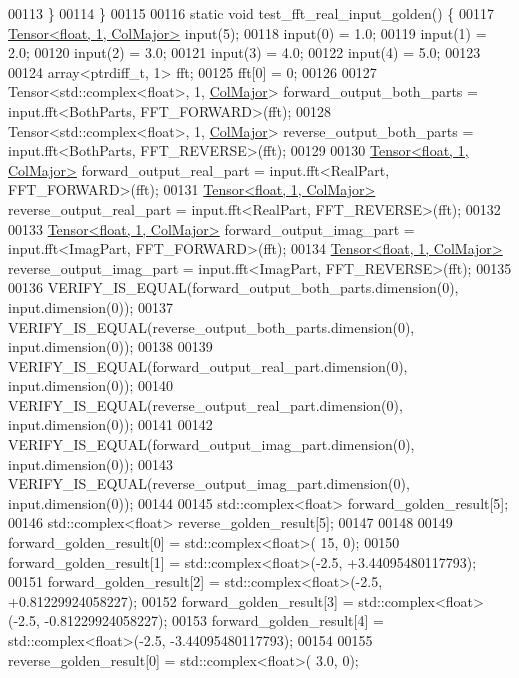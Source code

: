 \begin{DoxyCode}
00113   \}
00114 \}
00115 
00116 \textcolor{keyword}{static} \textcolor{keywordtype}{void} test\_fft\_real\_input\_golden() \{
00117   \hyperlink{class_eigen_1_1_tensor}{Tensor<float, 1, ColMajor>} input(5);
00118   input(0) = 1.0;
00119   input(1) = 2.0;
00120   input(2) = 3.0;
00121   input(3) = 4.0;
00122   input(4) = 5.0;
00123 
00124   array<ptrdiff\_t, 1> fft;
00125   fft[0] = 0;
00126 
00127   Tensor<std::complex<float>, 1, \hyperlink{group__enums_ggaacded1a18ae58b0f554751f6cdf9eb13a0cbd4bdd0abcfc0224c5fcb5e4f6669a}{ColMajor}> forward\_output\_both\_parts = input.fft<BothParts, 
      FFT\_FORWARD>(fft);
00128   Tensor<std::complex<float>, 1, \hyperlink{group__enums_ggaacded1a18ae58b0f554751f6cdf9eb13a0cbd4bdd0abcfc0224c5fcb5e4f6669a}{ColMajor}> reverse\_output\_both\_parts = input.fft<BothParts, 
      FFT\_REVERSE>(fft);
00129 
00130   \hyperlink{class_eigen_1_1_tensor}{Tensor<float, 1, ColMajor>} forward\_output\_real\_part = input.fft<RealPart, 
      FFT\_FORWARD>(fft);
00131   \hyperlink{class_eigen_1_1_tensor}{Tensor<float, 1, ColMajor>} reverse\_output\_real\_part = input.fft<RealPart, 
      FFT\_REVERSE>(fft);
00132 
00133   \hyperlink{class_eigen_1_1_tensor}{Tensor<float, 1, ColMajor>} forward\_output\_imag\_part = input.fft<ImagPart, 
      FFT\_FORWARD>(fft);
00134   \hyperlink{class_eigen_1_1_tensor}{Tensor<float, 1, ColMajor>} reverse\_output\_imag\_part = input.fft<ImagPart, 
      FFT\_REVERSE>(fft);
00135 
00136   VERIFY\_IS\_EQUAL(forward\_output\_both\_parts.dimension(0), input.dimension(0));
00137   VERIFY\_IS\_EQUAL(reverse\_output\_both\_parts.dimension(0), input.dimension(0));
00138 
00139   VERIFY\_IS\_EQUAL(forward\_output\_real\_part.dimension(0), input.dimension(0));
00140   VERIFY\_IS\_EQUAL(reverse\_output\_real\_part.dimension(0), input.dimension(0));
00141 
00142   VERIFY\_IS\_EQUAL(forward\_output\_imag\_part.dimension(0), input.dimension(0));
00143   VERIFY\_IS\_EQUAL(reverse\_output\_imag\_part.dimension(0), input.dimension(0));
00144 
00145   std::complex<float> forward\_golden\_result[5];
00146   std::complex<float> reverse\_golden\_result[5];
00147 
00148 
00149   forward\_golden\_result[0] = std::complex<float>(  15, 0);
00150   forward\_golden\_result[1] = std::complex<float>(-2.5, +3.44095480117793);
00151   forward\_golden\_result[2] = std::complex<float>(-2.5, +0.81229924058227);
00152   forward\_golden\_result[3] = std::complex<float>(-2.5, -0.81229924058227);
00153   forward\_golden\_result[4] = std::complex<float>(-2.5, -3.44095480117793);
00154 
00155   reverse\_golden\_result[0] = std::complex<float>( 3.0, 0);

\end{DoxyCode}

